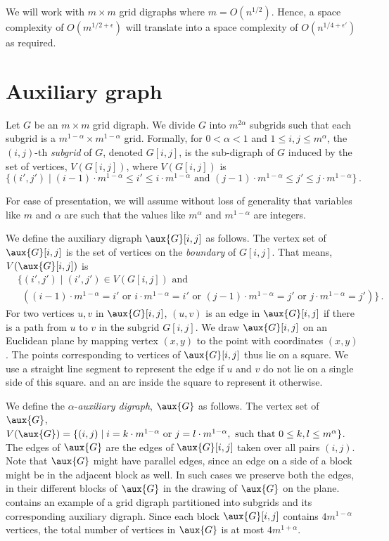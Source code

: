 \documentclass{toc}
\begin{document}
We will work with $m\times m$ grid 
digraphs %
where $m = O(n^{1/2})$. Hence, a
%
space complexity  %
of $O(m^{1/2 + \epsilon})$ will translate into a space complexity of $O(n^{1/4 + \epsilon'})$ as required.

\section{Auxiliary graph}
\label{sec:aux}
Let $G$ be an $m \times m$ grid 
digraph. %
We divide $G$ into $m^{2\alpha}$ subgrids such that each subgrid is a $m^{1-\alpha} \times m^{1-\alpha}$ grid. Formally, for 
$0 < \alpha < 1$ and %
$1 \leq i,j \leq m^{\alpha}$, the $(i,j)$-th \emph{subgrid} of $G$,
denoted %
$G[i,j]$,  %
is the %
sub-digraph %
of $G$ induced by the set of vertices, $V(G[i,j])$, where $V(G[i, j])$
is %
\[\{(i',j') \mid (i-1)\cdot m^{1-\alpha} \leq i' \leq i\cdot m^{1-\alpha} \textrm{ and } (j-1)\cdot m^{1-\alpha} \leq j' \leq j\cdot m^{1-\alpha} \}\,.\]
%

For ease of presentation, we will assume without loss of generality that variables like $m$ and $\alpha$ are such that the values like $m^{\alpha}$ and $m^{1-\alpha}$ are integers. %


%
%
%
%
We define %
the auxiliary 
digraph %
$\aux{G}[i,j]$ as follows. The vertex set of $\aux{G}[i,j]$ is the set of vertices on the \emph{boundary} of $G[i, j]$. 
%
%
That means, $V(\aux{G}[i,j])$ is
%
\begin{align*}
& \{(i',j') \mid (i',j') \in V(G[i,j]) \textrm{ and }\\
& \ \ ((i-1)\cdot m^{1-\alpha} = i' \textrm{ or } i\cdot m^{1-\alpha} = i' \textrm{ or } (j-1)\cdot m^{1-\alpha} = j' \textrm{ or } j\cdot m^{1-\alpha} = j') \}\,.
\end{align*}
For two vertices $u,v$ in $\aux{G}[i,j]$, $(u,v)$ is an edge in $\aux{G}[i,j]$ if there is a path from $u$ to $v$ in the subgrid $G[i,j]$. 
%
We draw $\aux{G}[i, j]$ on an Euclidean plane by mapping vertex $(x,y)$ to the point with %
coordinates  %
$(x, y)$. The points corresponding to vertices of $\aux{G}[i,j]$ thus lie on a square. We %
use a straight line %
segment  %
to represent the edge if $u$ and $v$ do not lie on a single side
%
%
of this square.  %
and an arc 
%
 inside the
%
square %
to represent it otherwise.  
%

%
We define the %
%
$\alpha$-\emph{auxiliary digraph}, %
$\aux{G}$ as follows. The vertex set of $\aux{G}$, $V(\aux{G}) = \{(i,j) \mid i = k\cdot m^{1-\alpha} \textrm{ or } j = l\cdot m^{1-\alpha}, \textrm{ such that } 0 \leq k,l \leq m^{\alpha} \}$. The edges of $\aux{G}$ are the edges of $\aux{G}[i,j]$ taken over all pairs $(i,j)$. Note that $\aux{G}$ might have parallel edges, since an edge on a side of a block might be %
in the adjacent block as well. In such cases we preserve both the edges,
%
%
in their different blocks of $\aux{G}$ in the drawing of $\aux{G}$ on the plane.  contains an example of a grid 
digraph %
partitioned into subgrids and its corresponding auxiliary 
digraph. %
Since each block $\aux{G}[i,j]$ contains $4m^{1-\alpha}$ vertices, the total number of vertices in $\aux{G}$ %
is  %
at most $4m^{1 + \alpha}$.
\end{document}
